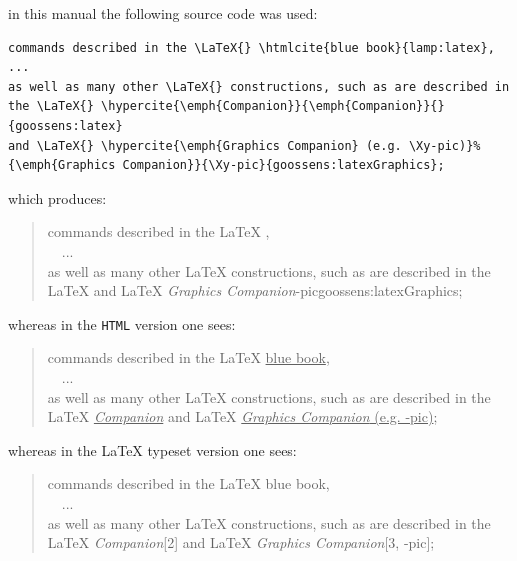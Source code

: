 \begin{changebar}
\smallskip\noindent\label{hyperciteXmpl}%
%
\html{\\}\noindent
{} in this manual the following source code was used:
\begin{small}
\begin{verbatim}
commands described in the \LaTeX{} \htmlcite{blue book}{lamp:latex}, 
...
as well as many other \LaTeX{} constructions, such as are described in 
the \LaTeX{} \hypercite{\emph{Companion}}{\emph{Companion}}{}{goossens:latex} 
and \LaTeX{} \hypercite{\emph{Graphics Companion} (e.g. \Xy-pic)}%
{\emph{Graphics Companion}}{\Xy-pic}{goossens:latexGraphics};
\end{verbatim}
\end{small}
which produces:
\begin{quote}
commands described in the \LaTeX{} , 
\\~~...\\
as well as many other \LaTeX{} constructions, such as are described in 
the \LaTeX{}  
and \LaTeX{} %
{\emph{Graphics Companion}}{\Xy-pic}{goossens:latexGraphics};
\end{quote}
\begin{latexonly}
whereas in the \texttt{HTML} version one sees:
\begin{quote}
commands described in the \LaTeX{} \underline{blue book}, 
\\~~...\\
as well as many other \LaTeX{} constructions, 
such as are described in the \LaTeX{} \underline{\emph{Companion}} 
and  \LaTeX{} \underline{\emph{Graphics Companion} (e.g. \Xy-pic)};
\end{quote}
\end{latexonly}
%
\begin{htmlonly}
whereas in the \LaTeX{} typeset version one sees:
\begin{quote}
commands described in the \LaTeX{} blue book,\\
~~...\\
as well as many other \LaTeX{} constructions, such as are described in the \LaTeX{} 
\textit{Companion}[2] and \LaTeX{} \textit{Graphics Companion}[3, \Xy-pic];
\end{quote}
\end{htmlonly}
\end{changebar}%


